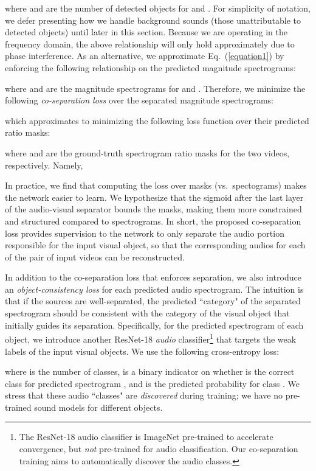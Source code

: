 \documentclass[10pt,twocolumn,letterpaper]{article}
\begin{document}
where  and  are the number of detected objects for  and . For simplicity of notation, we defer presenting how we handle background sounds (those unattributable to detected objects) until later in this section. Because we are operating in the frequency domain, the above relationship will only hold approximately due to phase interference.  As an alternative, we approximate Eq.~(\ref{equation1}) by enforcing the following relationship on the predicted magnitude spectrograms:

where  and  are the magnitude spectrograms for  and . Therefore, we minimize the following \emph{co-separation loss} over the separated magnitude spectrograms:

which approximates to minimizing the following loss function over their predicted ratio masks:

where  and  are the ground-truth spectrogram ratio masks for the two videos, respectively. Namely,

In practice, we find that computing the loss over masks (vs.~spectograms) makes the network easier to learn. We hypothesize that the sigmoid after the last layer of the audio-visual separator bounds the masks, making them more constrained and structured compared to spectrograms. In short, the proposed co-separation loss provides supervision to the network to only separate the audio portion responsible for the input visual object, so that the corresponding audios for each of the pair of input videos can be reconstructed.

In addition to the co-separation loss that enforces separation, we also introduce an \emph{object-consistency loss} for each predicted audio spectrogram.  The intuition is that if the sources are well-separated, the predicted ``category" of the separated spectrogram should be consistent with the category of the visual object that initially guides its separation. Specifically, for the predicted spectrogram of each object, we introduce another ResNet-18 \emph{audio} classifier\footnote{The ResNet-18 audio classifier is ImageNet pre-trained to accelerate convergence, but \emph{not} pre-trained for audio classification. Our co-separation training aims to automatically discover the audio classes.} that targets the weak labels of the input visual objects. We use the following cross-entropy loss:

where  is the number of classes,  is a binary indicator on whether  is the correct class for predicted spectrogram , and  is the predicted probability for class . We stress that these audio ``classes" are \emph{discovered} during training; we have no pre-trained sound models for different objects.
\end{document}
